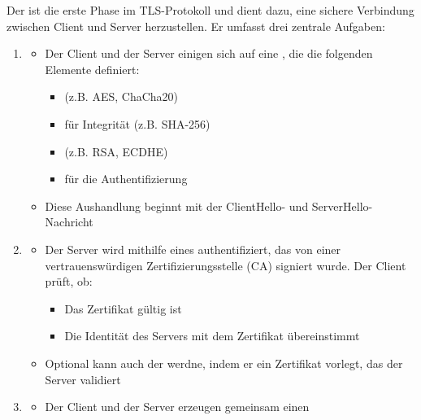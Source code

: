 \begin{infoBox}[title=TLS Handshake]
    Der  ist die erste Phase im TLS-Protokoll und dient dazu, eine sichere Verbindung zwischen Client und Server herzustellen. Er umfasst drei zentrale Aufgaben:
    \begin{enumerate}
        \item {}
        \begin{itemize}
            \item Der Client und der Server einigen sich auf eine , die die folgenden Elemente definiert:
            \begin{itemize}
                \item {} (z.B. AES, ChaCha20)
                \item {} für Integrität (z.B. SHA-256)
                \item {} (z.B. RSA, ECDHE)
                \item {} für die Authentifizierung
            \end{itemize}
            \item Diese Aushandlung beginnt mit der ClientHello- und ServerHello- Nachricht
        \end{itemize}
        \item {}
        \begin{itemize}
            \item Der Server wird mithilfe eines  authentifiziert, das von einer vertrauenswürdigen Zertifizierungsstelle (CA) signiert wurde. Der Client prüft, ob:
            \begin{itemize}
                \item Das Zertifikat gültig ist
                \item Die Identität des Servers mit dem Zertifikat übereinstimmt
            \end{itemize}
            \item Optional kann auch der  werdne, indem er ein Zertifikat vorlegt, das der Server validiert
        \end{itemize}
        \item {}
        \begin{itemize}
            \item Der Client und der Server erzeugen gemeinsam einen 

\end{itemize}
\end{enumerate}
\end{infoBox}
